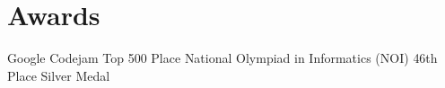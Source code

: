 \documentclass[10pt,a4paper,roman]{moderncv} %
\begin{document}

\section{Awards}
        {Google Codejam}
        {Top 500 Place}
        {}{}{}
        {National Olympiad in Informatics (NOI)}
        {46th Place}
        {Silver Medal}
        {}{}
\end{document}
